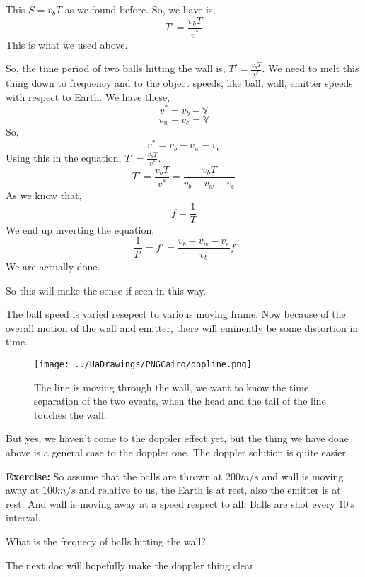 \documentclass[a4paper]{article}
\begin{document}
This $S  = v_b T$ as we found before. So, we have is, 
\[T' = \frac{v_b T}{v^* }\] 
This is what we used above. 

So, the time period of two balls hitting the wall is, $T' = \frac{v_b T}{v^* }$. We need to melt this thing down to frequency 
and to the object speeds, like ball, wall, emitter speeds with respect to Earth. 
We have these, 
\begin{equation}
    v^* = v_b - \mathbb{V}
\end{equation}  
\begin{equation}
    v_w + v_e = \mathbb{V}
\end{equation} 
So, 
\[ v^* =v_b - v_w - v_e \]
Using this in the equation, $T' = \frac{v_b T}{v^* }$.
\[ T' = \frac{v_b T}{v^* } = \frac{v_b T}{v_b - v_w - v_e}\]
As we know that, 
\begin{equation}
f = \frac{1}{T}
\end{equation} 
We end up inverting the equation, 
\begin{equation}
\frac{1}{T'} = f' = \frac{v_b - v_w - v_e}{v_b} f
\end{equation}
We are actually done. 

So this will make the sense if seen in this way. 

The ball speed is varied resepect to various moving frame. Now because of the overall 
motion of the wall and emitter, there will eminently be some distortion in time. 
\begin{figure} [hbtp]
    \centering
    \texttt{[image: ../UaDrawings/PNGCairo/dopline.png]}
    \caption{The line is moving through the wall, we want to know the time separation of the two events, when the head and the tail of the line touches the wall.}
    \label{ }
\end{figure} 
But yes, we haven't come to the doppler effect yet, but the thing we have done above is a 
general case to the doppler one. The doppler solution is quite easier. 

\begin{tcolorbox}
    \textbf{Exercise:}
    So assume that the balls are thrown at $200 m/s$ and wall is moving away at $100 m/s$ 
    and relative to us, the Earth is at rest, also the emitter is at rest. And 
    wall is moving away at a speed respect to all. Balls are shot every $10 \, s$ interval. 
    
    What is the frequecy of balls hitting the wall?
\end{tcolorbox} 
The next doc will hopefully make the doppler thing clear. 
\end{document}
